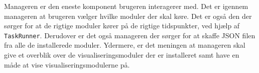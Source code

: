 Manageren er den eneste komponent brugeren interagerer med.
Det er igennem manageren at brugeren vælger hvilke moduler der skal køre.
Det er også den der sørger for at de rigtige moduler kører på de rigtige tidspunkter, ved hjælp af \texttt{TaskRunner}.
Derudover er det også manageren der sørger for at skaffe JSON filen fra alle de installerede moduler.
Ydermere, er det meningen at manageren skal give et overblik over de visualiseringsmoduler der er installeret samt have en måde at vise visualiseringsmodulerne på.